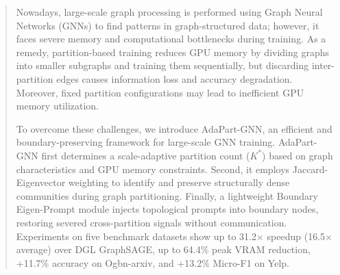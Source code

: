 \begin{abstract}
Nowadays, large-scale graph processing is performed using Graph Neural Networks (GNNs) to find patterns in graph-structured data; however, it faces severe memory and computational bottlenecks during training. As a remedy, partition-based training reduces GPU memory by dividing graphs into smaller subgraphs and training them sequentially, but discarding inter-partition edges causes information loss and accuracy degradation. Moreover, fixed partition configurations may lead to inefficient GPU memory utilization.

To overcome these challenges, we introduce AdaPart-GNN, an efficient and boundary-preserving framework for large-scale GNN training. AdaPart-GNN first determines a scale-adaptive partition count ($K^*$) based on graph characteristics and GPU memory constraints. Second, it employs Jaccard-Eigenvector weighting to identify and preserve structurally dense communities during graph partitioning. Finally, a lightweight Boundary Eigen-Prompt module injects topological prompts into boundary nodes, restoring severed cross-partition signals without communication. Experiments on five benchmark datasets show up to 31.2$\times$ speedup (16.5$\times$ average) over DGL GraphSAGE, up to 64.4\% peak VRAM reduction, +11.7\% accuracy on Ogbn-arxiv, and +13.2\% Micro-F1 on Yelp.
\end{abstract}

